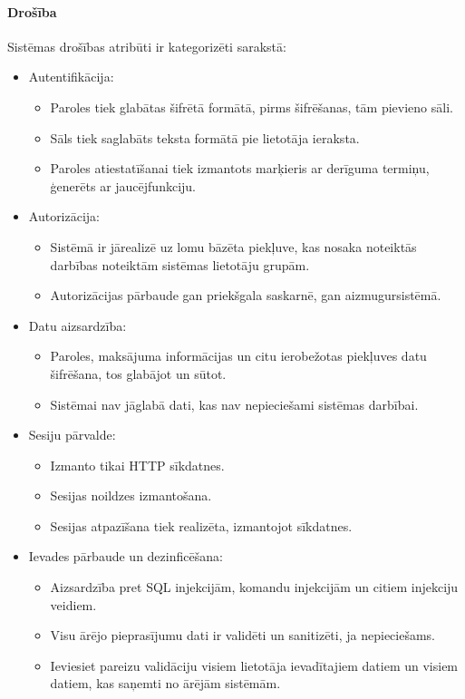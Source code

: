 \paragraph{Drošība}

Sistēmas drošības atribūti ir kategorizēti sarakstā:
\begin{itemize}
	\item Autentifikācija:
	      \begin{itemize}
		      \item Paroles tiek glabātas šifrētā formātā, pirms šifrēšanas, tām pievieno sāli.
		      \item Sāls tiek saglabāts teksta formātā pie lietotāja ieraksta.
		      \item Paroles atiestatīšanai tiek izmantots marķieris ar derīguma termiņu, ģenerēts ar jaucējfunkciju.
	      \end{itemize}

	\item Autorizācija:
	      \begin{itemize}
		      \item Sistēmā ir jārealizē uz lomu bāzēta piekļuve, kas nosaka noteiktās darbības noteiktām sistēmas lietotāju grupām.
		      \item Autorizācijas pārbaude gan priekšgala saskarnē, gan aizmugursistēmā.
	      \end{itemize}

	\item Datu aizsardzība:
	      \begin{itemize}
		      \item Paroles, maksājuma informācijas un citu ierobežotas piekļuves datu šifrēšana, tos glabājot un sūtot.
		      \item Sistēmai nav jāglabā dati, kas nav nepieciešami sistēmas darbībai.
	      \end{itemize}

	\item Sesiju pārvalde:
	      \begin{itemize}
		      \item Izmanto tikai HTTP sīkdatnes.
		      \item Sesijas noildzes izmantošana.
		      \item Sesijas atpazīšana tiek realizēta, izmantojot sīkdatnes.
	      \end{itemize}

	\item Ievades pārbaude un dezinficēšana:
	      \begin{itemize}
		      \item Aizsardzība pret SQL injekcijām, komandu injekcijām un citiem injekciju veidiem.
		      \item Visu ārējo pieprasījumu dati ir validēti un sanitizēti, ja nepieciešams.
		      \item Ieviesiet pareizu validāciju visiem lietotāja ievadītajiem datiem un visiem datiem, kas saņemti no ārējām sistēmām.
	      \end{itemize}


\end{itemize}
